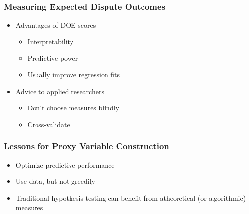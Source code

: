 \documentclass[10pt]{beamer}
\begin{document}
\begin{frame}
  \frametitle{Measuring Expected Dispute Outcomes}

  \begin{itemize}
    \item Advantages of DOE scores
    \begin{itemize}
      \item Interpretability
      \item Predictive power
      \item Usually improve regression fits
    \end{itemize}

    \item Advice to applied researchers
    \begin{itemize}
      \item Don't choose measures blindly
      \item Cross-validate
    \end{itemize}
  \end{itemize}
\end{frame}

\begin{frame}
  \frametitle{Lessons for Proxy Variable Construction}

  \begin{itemize}
    \item Optimize predictive performance
    \item Use data, but not greedily
    \item Traditional hypothesis testing can benefit from atheoretical (or algorithmic) measures
  \end{itemize}
\end{frame}

\end{document}
